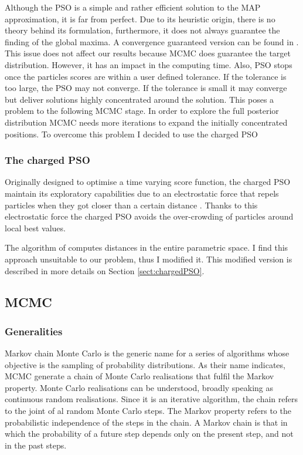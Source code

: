 Although the PSO is a simple and rather efficient solution to the MAP approximation, it is far from perfect. Due to its heuristic origin, there is no theory behind its formulation, furthermore, it does not always guarantee the finding of the global maxima. A convergence guaranteed version can be found in \citet{Patel2013}. This issue does not affect our results because MCMC does guarantee the target distribution. However, it has an impact in the computing time. Also, PSO stops once the particles scores are within a user defined tolerance. If the tolerance is too large, the PSO may not converge. If the tolerance is small it may converge but deliver solutions highly concentrated around the solution. This poses a problem to the following MCMC stage. In order to explore the full posterior distribution MCMC needs more iterations to expand the initially concentrated positions. To overcome this problem I decided to use the charged PSO \citep{Blackwell2002}


\subsubsection{The charged PSO}
Originally designed to optimise a time varying score function, the charged PSO maintain its exploratory capabilities due to an electrostatic force that repels particles when they got closer than a certain distance \citep{Blackwell2002}. Thanks to this electrostatic force the charged PSO avoids the over-crowding of particles around local best values.

The algorithm of \citet{Blackwell2002} computes distances in the entire parametric space. I find this approach unsuitable to our problem, thus I modified it. This modified version is described in more details on Section \ref{sect:chargedPSO}. 

 
\subsection{MCMC}
\subsubsection{Generalities}
Markov chain Monte Carlo is the generic name for a series of algorithms whose objective is the sampling of probability distributions. As their name indicates, MCMC generate a chain of Monte Carlo realisations that fulfil the Markov property. Monte Carlo realisations can be understood, broadly speaking as continuous random realisations. Since it is an iterative algorithm, the chain refers to the joint of al random Monte Carlo steps. The Markov property refers to the probabilistic independence of the steps in the chain. A Markov chain is that in which the probability of a future step depends only on the present step, and not in the past steps.

